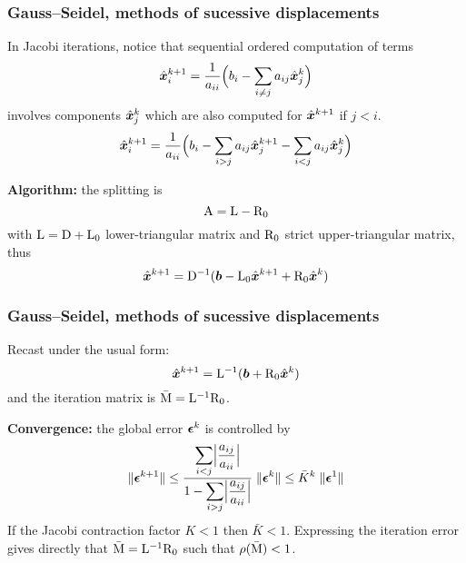 \begin{frame}
  \frametitle{Gauss--Seidel, methods of sucessive displacements}

In Jacobi iterations, notice that sequential ordered computation of terms
\begin{equation}
\hat{\boldsymbol x}^{k+1}_i = \frac{1}{a_{ii}}\Bigl( b_i - \sum_{i\neq j} a_{ij} \hat{\boldsymbol x}^{k}_j \Bigr)
\end{equation}
involves components $\hat{\boldsymbol x}^{k}_j$ which are also computed for $\hat{\boldsymbol x}^{k+1}$ if $j < i$.
\begin{equation}
\hat{\boldsymbol x}^{k+1}_i = \frac{1}{a_{ii}}\Bigl( b_i - \sum_{i > j} a_{ij} \hat{\boldsymbol x}^{k+1}_j - \sum_{i < j} a_{ij} \hat{\boldsymbol x}^{k}_j \Bigr)
\end{equation}

\medskip
\textbf{Algorithm:} the splitting is
\[
{\mathrm A} = {\mathrm L} - {\mathrm R_0}
\]
with ${\mathrm L} = {\mathrm D} + {\mathrm L_0}$ lower-triangular matrix and ${\mathrm R_0}$ strict upper-triangular matrix, thus
\[
\hat{\boldsymbol x}^{k+1} = {\mathrm D}^{-1}({\boldsymbol b} - {\mathrm L_0} \hat{\boldsymbol x}^{k+1} + {\mathrm R_0} \hat{\boldsymbol x}^{k})
\]

\end{frame}

\begin{frame}
  \frametitle{Gauss--Seidel, methods of sucessive displacements}

Recast under the usual form:
\[
\hat{\boldsymbol x}^{k+1} = {\mathrm L}^{-1}({\boldsymbol b} + {\mathrm R_0} \hat{\boldsymbol x}^{k})
\]
and the iteration matrix is $\bar {{\mathrm M}} = {\mathrm L}^{-1}{\mathrm R_0}$.

\medskip
\textbf{Convergence:} the global error ${\boldsymbol \epsilon}^k$ is controlled by
\begin{equation*}
{\lVert {\boldsymbol \epsilon}^{k+1} \rVert} \leq \frac{\displaystyle\sum_{i < j} \Bigl\lvert\frac{a_{ij}}{a_{ii}}\Bigr\rvert}{1 - \displaystyle\sum_{i > j} \Bigl\lvert\frac{a_{ij}}{a_{ii}}\Bigr\rvert}\;{\lVert {\boldsymbol \epsilon}^{k} \rVert} \leq \bar{K}^k \; {\lVert {\boldsymbol \epsilon}^{1} \rVert}
\end{equation*}
If the Jacobi contraction factor $K < 1$ then $\bar{K} < 1$.
Expressing the iteration error gives directly that $\bar{{\mathrm M}} = {\mathrm L}^{-1}{\mathrm R_0}$ such that $\rho(\bar{{\mathrm M}})< 1$.

\end{frame}

